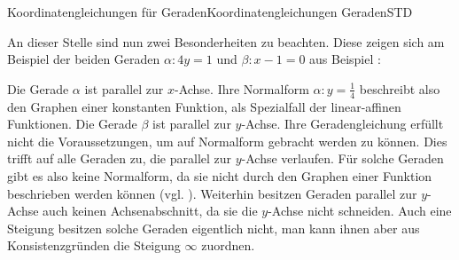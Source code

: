 \begin{MXContent}{Koordinatengleichungen für Geraden}{Koordinatengleichungen Geraden}{STD}
\begin{MExample}
\begin{center}
{\begin{tikzpicture}
\end{tikzpicture}
}
\end{center}
\end{MExample}

An dieser Stelle sind nun zwei Besonderheiten zu beachten. Diese zeigen sich am Beispiel der beiden Geraden $\alpha\colon 4y=1$ und $\beta\colon x-1=0$ aus Beispiel :

 \begin{center}
\end{center}

 \begin{center}
\end{center}

Die Gerade $\alpha$ ist parallel zur $x$-Achse. Ihre Normalform $\alpha\colon y=\frac{1}{4}$ beschreibt also den Graphen einer konstanten Funktion, als Spezialfall der linear-affinen Funktionen. Die Gerade $\beta$ ist parallel zur $y$-Achse. Ihre Geradengleichung erfüllt nicht die Voraussetzungen, um auf Normalform gebracht werden zu können. Dies trifft auf alle Geraden zu, die parallel zur $y$-Achse verlaufen. Für solche Geraden gibt es also keine Normalform, da sie nicht durch den Graphen einer Funktion beschrieben werden können (vgl. ). Weiterhin besitzen Geraden parallel zur $y$-Achse auch keinen Achsenabschnitt, da sie die $y$-Achse nicht schneiden. Auch eine Steigung besitzen solche Geraden eigentlich nicht, man kann ihnen aber aus Konsistenzgründen die Steigung $\infty$ zuordnen.


\end{MXContent}
